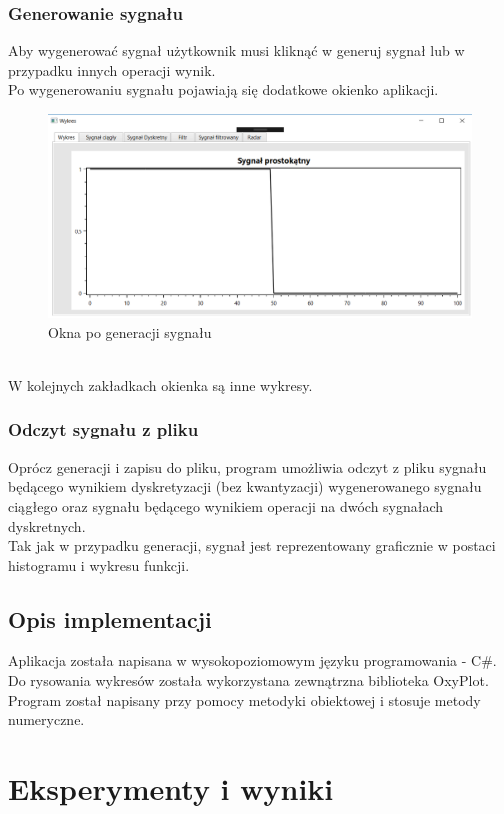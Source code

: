 \documentclass[12pt]{article}
\begin{document}
\subsubsection{Generowanie sygnału}
Aby wygenerować sygnał użytkownik musi kliknąć w generuj sygnał lub w przypadku innych operacji wynik.
\\Po wygenerowaniu sygnału pojawiają się dodatkowe okienko aplikacji.
\begin{figure}[h!]
 \centering
 \includegraphics[width=15.3cm]{prost.PNG}
 \vspace{-0.3cm}
 \caption{Okna po generacji sygnału}
 \label{Widok_aplikacjis}
\end{figure}
\\W kolejnych zakładkach okienka są inne wykresy.

\subsubsection{Odczyt sygnału z pliku}
Oprócz generacji i zapisu do pliku, program umożliwia odczyt z pliku sygnału będącego wynikiem dyskretyzacji (bez kwantyzacji) wygenerowanego
sygnału ciągłego oraz sygnału będącego wynikiem operacji na dwóch sygnałach dyskretnych.
\\Tak jak w przypadku generacji, sygnał jest  reprezentowany graficznie w postaci histogramu i wykresu funkcji.

\subsection{Opis implementacji}
Aplikacja została napisana w wysokopoziomowym języku programowania - C\#. Do rysowania wykresów została wykorzystana zewnątrzna biblioteka OxyPlot. Program został napisany przy pomocy metodyki obiektowej i stosuje metody numeryczne.

\section{Eksperymenty i wyniki}
\end{document}

